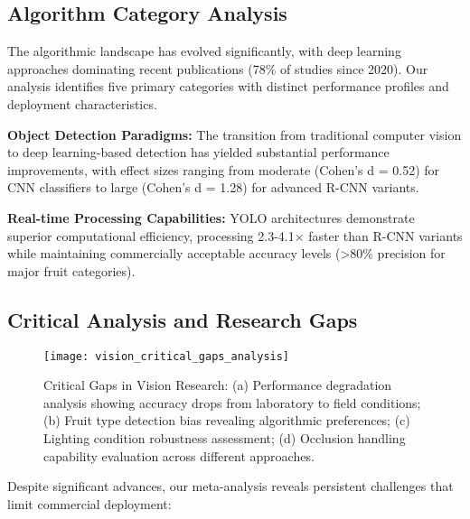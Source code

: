 \subsection{Algorithm Category Analysis}
\label{subsec:vision_algorithm_categories}



The algorithmic landscape has evolved significantly, with deep learning approaches dominating recent publications (78\% of studies since 2020). Our analysis identifies five primary categories with distinct performance profiles and deployment characteristics.

\textbf{Object Detection Paradigms:} The transition from traditional computer vision to deep learning-based detection has yielded substantial performance improvements, with effect sizes ranging from moderate (Cohen's d = 0.52) for CNN classifiers to large (Cohen's d = 1.28) for advanced R-CNN variants.

\textbf{Real-time Processing Capabilities:} YOLO architectures demonstrate superior computational efficiency, processing 2.3-4.1× faster than R-CNN variants while maintaining commercially acceptable accuracy levels (>80\% precision for major fruit categories).

\subsection{Critical Analysis and Research Gaps}
\label{subsec:vision_critical_analysis}

\begin{figure}[!htbp]
    \centering
    \texttt{[image: vision\_critical\_gaps\_analysis]}
    \caption{Critical Gaps in Vision Research: (a) Performance degradation analysis showing accuracy drops from laboratory to field conditions; (b) Fruit type detection bias revealing algorithmic preferences; (c) Lighting condition robustness assessment; (d) Occlusion handling capability evaluation across different approaches.}
    \label{fig:vision_critical_gaps}
\end{figure}

Despite significant advances, our meta-analysis reveals persistent challenges that limit commercial deployment:

